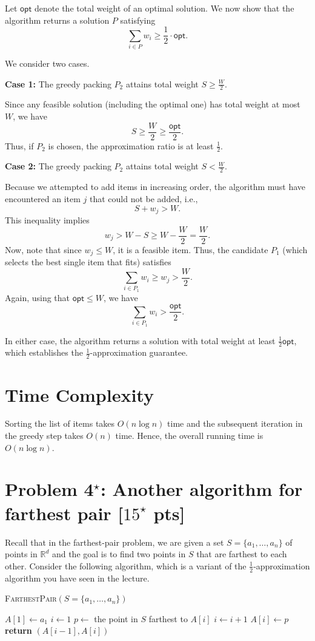 \documentclass[letterpaper, 11pt]{article}
\newcommand{\1}{\mathds{1}}	%
\theoremstyle{definition}
\newcommand{\problem}[1]{\section*{Problem #1}}
\newenvironment{solution}{{\par\noindent\it Solution.}}{}
\begin{document}
\begin{solution}
Let \(\mathsf{opt}\) denote the total weight of an optimal solution. We now show that the algorithm returns a solution \(P\) satisfying
\[
\sum_{i\in P} w_i \ge \frac{1}{2}\cdot \mathsf{opt}.
\]

We consider two cases.

\textbf{Case 1:} The greedy packing \(P_2\) attains total weight \(S \ge \frac{W}{2}\).

Since any feasible solution (including the optimal one) has total weight at most \(W\), we have
\[
S \ge \frac{W}{2} \ge \frac{\mathsf{opt}}{2}.
\]
Thus, if \(P_2\) is chosen, the approximation ratio is at least \(\frac{1}{2}\).

\textbf{Case 2:} The greedy packing \(P_2\) attains total weight \(S < \frac{W}{2}\).

Because we attempted to add items in increasing order, the algorithm must have encountered an item \(j\) that could not be added, i.e., 
\[
S + w_j > W.
\]
This inequality implies
\[
w_j > W - S \ge W - \frac{W}{2} = \frac{W}{2}.
\]
Now, note that since \(w_j \leq W\), it is a feasible item. Thus, the candidate \(P_1\) (which selects the best single item that fits) satisfies
\[
\sum_{i\in P_1} w_i \ge w_j > \frac{W}{2}.
\]
Again, using that \(\mathsf{opt} \leq W\), we have
\[
\sum_{i\in P_1} w_i > \frac{\mathsf{opt}}{2}.
\]

In either case, the algorithm returns a solution with total weight at least \(\frac{1}{2}\mathsf{opt}\), which establishes the \(\frac{1}{2}\)-approximation guarantee.

\section*{Time Complexity}

Sorting the list of items takes \(O(n \log n)\) time and the subsequent iteration in the greedy step takes \(O(n)\) time. Hence, the overall running time is \(O(n \log n)\).
\end{solution}
\clearpage


\problem{4$^\star$: Another algorithm for farthest pair [$15^\star$ pts]}

Recall that in the farthest-pair problem, we are given a set $S = \{a_1,\dots,a_n\}$ of points in $\mathbb{R}^d$ and the goal is to find two points in $S$ that are farthest to each other.
Consider the following algorithm, which is a variant of the $\frac{1}{2}$-approximation algorithm you have seen in the lecture.

\begin{algorithm}[h]
    \caption{\textsc{FarthestPair}$(S = \{a_1,\dots,a_n\})$}
	\begin{algorithmic}
        \State $A[1] \leftarrow a_1$
        \State $i \leftarrow 1$
            \State $p \leftarrow$ the point in $S$ farthest to $A[i]$
            \State $i \leftarrow i+1$
            \State $A[i] \leftarrow p$
            \EndIf
        \EndWhile
        \State \textbf{return} $(A[i-1],A[i])$
	\end{algorithmic}
	\label{alg-top}
\end{algorithm}
\end{document}
